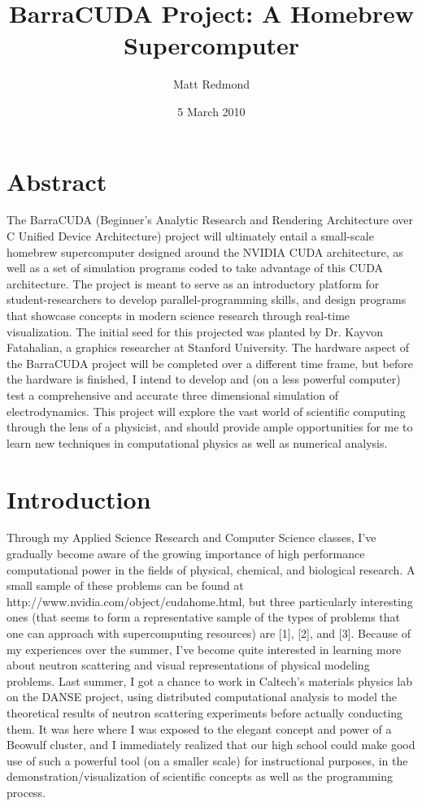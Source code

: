 \documentclass[10pt]{article}
\title{BarraCUDA Project: A Homebrew Supercomputer}
\author{Matt Redmond}
\date{5 March 2010}
\begin{document}
\maketitle
\tableofcontents
\clearpage

\section{Abstract}
The BarraCUDA (Beginner's Analytic Research and Rendering Architecture over C Unified Device Architecture) project will ultimately entail a small-scale homebrew supercomputer designed around the NVIDIA CUDA architecture, as well as a set of simulation programs coded to take advantage of this CUDA architecture. The project is meant to serve as an introductory platform for student-researchers to develop parallel-programming skills, and design programs that showcase concepts in modern science research through real-time visualization. The initial seed for this projected was planted by Dr. Kayvon Fatahalian, a graphics researcher at Stanford University. The hardware aspect of the BarraCUDA project will be completed over a different time frame, but before the hardware is finished, I intend to develop and (on a less powerful computer) test a comprehensive and accurate three dimensional simulation of electrodynamics. This project will explore the vast world of scientific computing through the lens of a physicist, and should provide ample opportunities for me to learn new techniques in computational physics as well as numerical analysis.

\section{Introduction} %
Through my Applied Science Research and Computer Science classes, I've gradually become aware of the growing importance of high performance computational power in the fields of physical, chemical, and biological research. A small sample of these problems can be found at http://www.nvidia.com/object/cudahome.html, but three particularly interesting ones (that seems to form a representative sample of the types of problems that one can approach with supercomputing resources) are [1], [2], and [3]. Because of my experiences over the summer, I've become quite interested in learning more about neutron scattering and visual representations of physical modeling problems. Last summer, I got a chance to work in Caltech's materials physics lab on the DANSE project, using distributed computational analysis to model the theoretical results of neutron scattering experiments before actually conducting them. It was here where I was exposed to the elegant concept and power of a Beowulf cluster, and I immediately realized that our high school could make good use of such a powerful tool (on a smaller scale) for instructional purposes, in the demonstration/visualization of scientific concepts as well as the programming process.
\end{document}
